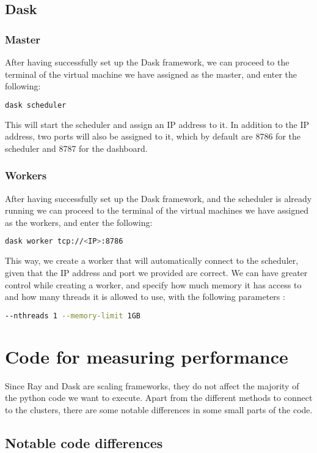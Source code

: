 \documentclass[conference]{IEEEtran}
\begin{document}
\subsection{Dask}
\subsubsection{Master}
After having successfully set up the Dask framework, we can proceed to the terminal of the virtual machine we have assigned as the master, and enter the following:
\begin{lstlisting}[language=bash]
dask scheduler
\end{lstlisting}
This will start the scheduler and assign an IP address to it. In addition to the IP address, two ports will also be assigned to it, which by default are 8786 for the scheduler and 8787 for the dashboard.
\subsubsection{Workers}
After having successfully set up the Dask framework, and the scheduler is already running we can proceed to the terminal of the virtual machines we have assigned as the workers, and enter the following:
\begin{lstlisting}[language=bash]
dask worker tcp://<IP>:8786
\end{lstlisting}
This way, we create a worker that will automatically connect to the scheduler, given that the IP address and port we provided are correct. We can have greater control while creating a worker, and specify how much memory it has access to and how many threads it is allowed to use, with the following parameters :
\begin{lstlisting}[language=bash]
--nthreads 1 --memory-limit 1GB
\end{lstlisting}
\section{Code for measuring performance}
Since Ray and Dask are scaling frameworks, they do not affect the majority of the python code we want to execute. Apart from the different methods to connect to the clusters, there are some notable differences in some small parts of the code.
\subsection{Notable code differences}
\end{document}
